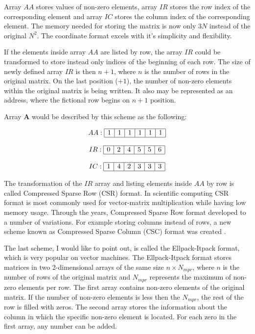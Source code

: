 \documentclass[thesis=M,english]{FITthesis}[2012/10/20]
\begin{document}
Array $AA$ stores values of non-zero elements, array $IR$ stores the row index of the corresponding element and array $IC$ stores the column index of the corresponding element. The memory needed for storing the matrix is now only $3N$ instead of the original $N^2$.  The coordinate format excels with it's simplicity and flexibility.

If the elements inside array $AA$ are listed by row, the array $IR$ could be transformed to store instead only indices of the beginning of each row. The size of newly defined array $IR$ is then $n+1$, where $n$ is the number of rows in the original matrix. On the last position ($+1$), the number of non-zero elements within the original matrix is being written. It also may be represented as an address, where the fictional row begins on $n+1$ position. 

Array $\textbf{A}$ would be described by this scheme as the following:

$$
\begin{array}{c}
AA:
\begin{array}{|c|c|c|c|c|c|}
 \hline
 1 & 1 & 1 & 1 & 1 & 1 \\
 \hline
\end{array}
\\ \\
IR:
\begin{array}{|c|c|c|c|c|c|}
 \hline
 0 & 2 & 4 & 5 & 5 & 6 \\
 \hline
\end{array}
\\ \\
IC:
\begin{array}{|c|c|c|c|c|c|}
 \hline
 1 & 4 & 2 & 3 & 3 & 3 \\
 \hline
\end{array}
\end{array}
$$



The transformation of the $IR$ array and listing elements inside $AA$ by row is called Compressed Sparse Row (CSR) format. In scientific computing CSR format is most commonly used for vector-matrix multiplication while having low memory usage.
Through the years, Compressed Sparse Row format developed to a number of variations. 
For example storing columns instead of rows, a new scheme known as Compressed Sparse Column (CSC) format was created \cite{Saad03}.

The last scheme, I would like to point out, is called the Ellpack-Itpack format, which is very popular on vector machines\cite{Saad03}. The Ellpack-Itpack format stores matrices in two 2-dimensional arrays of the same size $n \times N_{mpr}$, where $n$ is the number of rows of the original matrix and $N_{mpr}$ represents the maximum of non-zero elements per row. The first array contains non-zero elements of the original matrix. If the number of non-zero elements is less then the $N_{mpr}$, the rest of the row is filled with zeros. The second array stores the information about the column in which the specific non-zero element is located. For each zero in the first array, any number can be added.
\end{document}
